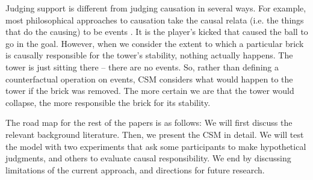 \documentclass[10pt, letterpaper]{article}
\newcommand{\sttodo}[2][]
{\todo[caption={\textbf{TG}}, size=\footnotesize, color = orange, #1]{#2}~}
\begin{document}
Judging support is different from judging causation in several ways.  
For example, most philosophical approaches to causation take the causal relata (i.e. the things that do the causing) to be events \citep{halpern2016causality,paul2013causation}. It is the player's kicked that caused the ball to go in the goal. 
However, when we consider the extent to which a particular brick is causally responsible for the tower's stability, nothing actually happens. The tower is just sitting there -- there are no events. So, rather than defining a counterfactual operation on events, CSM considers what would happen to the tower if the brick was removed. 
The more certain we are that the tower would collapse, the more responsible the brick for its stability. 

The road map for the rest of the papers is as follows: We will first discuss the relevant background literature. Then, we present the CSM in detail. We will test the model with two experiments that ask some participants to make hypothetical judgments, and others to evaluate causal responsibility. We end by discussing limitations of the current approach, and directions for future research. 
\end{document}
